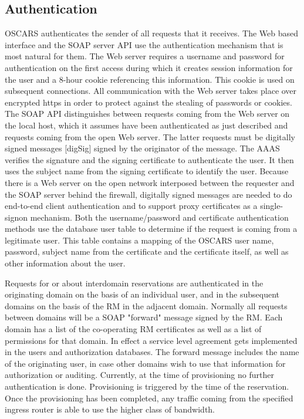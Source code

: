 \documentclass[conference]{IEEEtran}
\begin{document}
\subsection{Authentication}
OSCARS authenticates the sender of all requests that it receives.
The Web based interface and the SOAP server API use the
authentication mechanism that is most natural for them. The Web server
requires a username and password for authentication on the first
access during which it creates session information for the user and a
8-hour cookie referencing this information. This cookie is used on subsequent
connections. All communication with the Web server takes place over
encrypted https in order to protect against the stealing of passwords
or cookies. The SOAP API distinguishes between requests coming from
the Web server on the local host, which it assumes have been authenticated
as just described and requests coming from the open Web server. The 
latter requests  must be digitally signed messages [digSig] signed by the
originator of the message. The AAAS verifies the signature and the signing certificate to authenticate
the user. It then uses the subject name from the signing certificate
to identify the user. Because there is a Web server on the open  network interposed between the
requester and the SOAP server behind the firewall, digitally signed messages are 
needed to do end-to-end client authentication and to support proxy certificates
as a single-signon mechanism. Both the username/password and certificate 
authentication methods use the database user table to
determine if the request is coming from a legitimate user. This table
contains a mapping of the OSCARS user name, password, subject name
from the certificate and the certificate itself, as well as other
information about the user.

Requests for or about interdomain
reservations are authenticated in the originating domain on the basis
of an individual user, and in the subsequent domains on the basis of
the RM in the adjacent domain. Normally all requests
between domains will be a SOAP "forward"  message
signed by the RM. Each domain has a list of the
co-operating RM certificates as well as a list of
permissions for that domain. In effect a service level agreement gets
implemented in the users and authorization databases. The forward
message includes the name of the originating user, in case other
domains wish to use that information for authorization or auditing.
Currently, at the time of provisioning no further authentication is
done. Provisioning is triggered by the time of the reservation. Once
the provisioning has been completed, any traffic coming from the
specified ingress router is able to use the higher class of bandwidth.
\end{document}
